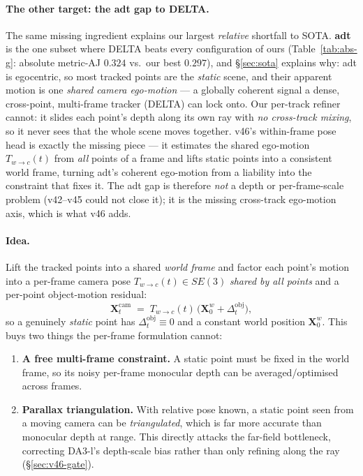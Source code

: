 \documentclass[11pt,a4paper]{article}
\begin{document}
\paragraph{The other target: the adt gap to DELTA.}
The same missing ingredient explains our largest \emph{relative} shortfall to SOTA. \textbf{adt} is the one
subset where DELTA beats every configuration of ours (Table~\ref{tab:abs-g}: absolute metric-AJ $0.324$
vs.\ our best $0.297$), and \S\ref{sec:sota} explains why: adt is egocentric, so most tracked points are the
\emph{static} scene, and their apparent motion is one \emph{shared camera ego-motion} --- a globally
coherent signal a dense, cross-point, multi-frame tracker (DELTA) can lock onto. Our per-track refiner
cannot: it slides each point's depth along its own ray with \emph{no cross-track mixing}, so it never sees
that the whole scene moves together. v46's within-frame pose head is exactly the missing piece --- it
estimates the shared ego-motion $T_{w\to c}(t)$ from \emph{all} points of a frame and lifts static points
into a consistent world frame, turning adt's coherent ego-motion from a liability into the constraint that
fixes it. The adt gap is therefore \emph{not} a depth or per-frame-scale problem (v42--v45 could not close
it); it is the missing cross-track ego-motion axis, which is what v46 adds.

\paragraph{Idea.}
Lift the tracked points into a shared \emph{world frame} and factor each point's motion into a per-frame
camera pose $T_{w\to c}(t)\in SE(3)$ \emph{shared by all points} and a per-point object-motion residual:
\begin{equation}
  \mathbf{X}^{\text{cam}}_t \;=\; T_{w\to c}(t)\,\bigl(\mathbf{X}^{w}_0 + \Delta^{\text{obj}}_t\bigr),
  \label{eq:worldframe}
\end{equation}
so a genuinely \emph{static} point has $\Delta^{\text{obj}}_t\equiv0$ and a constant world position
$\mathbf{X}^{w}_0$. This buys two things the per-frame formulation cannot:
\begin{enumerate}
  \item \textbf{A free multi-frame constraint.} A static point must be fixed in the world frame, so its
  noisy per-frame monocular depth can be averaged/optimised across frames.
  \item \textbf{Parallax triangulation.} With relative pose known, a static point seen from a moving camera
  can be \emph{triangulated}, which is far more accurate than monocular depth at range. This directly
  attacks the far-field bottleneck, correcting DA3-l's depth-scale bias rather than only refining along the
  ray (\S\ref{sec:v46-gate}).
\end{enumerate}
\end{document}

